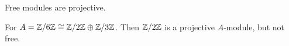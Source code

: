 \begin{example}
  Free modules are projective.
\end{example}

\begin{example}
  For $A = \mathbb{Z} / 6 \mathbb{Z} \cong \mathbb{Z} / 2 \mathbb{Z} \oplus \mathbb{Z} / 3 \mathbb{Z}$.
  Then $\mathbb{Z} / 2 \mathbb{Z}$ is a projective $A$-module, but not free.
\end{example}

